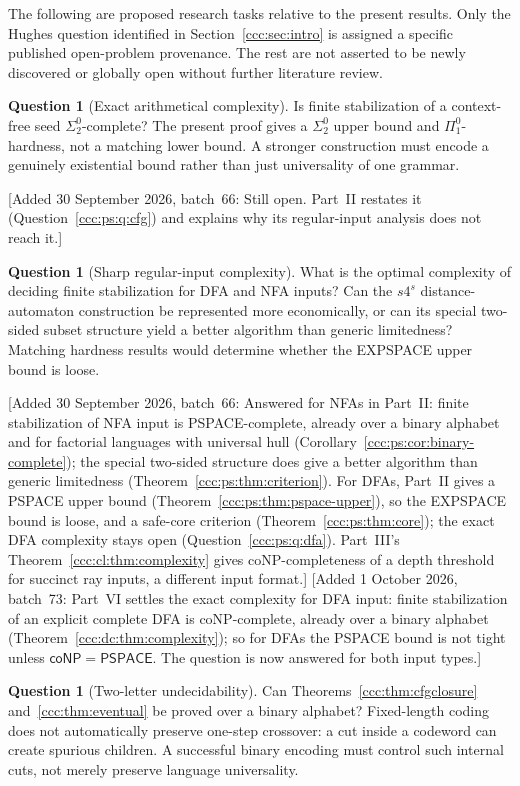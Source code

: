 \documentclass[11pt,letterpaper]{article}
\theoremstyle{definition}
\newtheorem{question}[theorem]{Question}
\theoremstyle{remark}
\newcommand{\wadd}[1]{\textup{[}Added 30 September 2026, batch~66: #1\textup{]}}
\newcommand{\PSPACE}{\mathsf{PSPACE}}
\newcommand{\waddsevthree}[1]{\textup{[}Added 1 October 2026, batch~73: #1\textup{]}}
\newcommand{\coNP}{\mathsf{coNP}}
\begin{document}
The following are proposed research tasks relative to the present results.
Only the Hughes question identified in Section~\ref{ccc:sec:intro} is assigned a
specific published open-problem provenance. The rest are not asserted to be
newly discovered or globally open without further literature review.

\begin{question}[Exact arithmetical complexity]\label{ccc:q:arithmetical}
Is finite stabilization of a context-free seed $\Sigma^0_2$-complete? The
present proof gives a $\Sigma^0_2$ upper bound and $\Pi^0_1$-hardness, not a
matching lower bound. A stronger construction must encode a genuinely
existential bound rather than just universality of one grammar.
\end{question}
\wadd{Still open. Part~II restates it (Question~\ref{ccc:ps:q:cfg}) and
explains why its regular-input analysis does not reach it.}

\begin{question}[Sharp regular-input complexity]\label{ccc:q:regular}
What is the optimal complexity of deciding finite stabilization for DFA and
NFA inputs? Can the $s4^s$ distance-automaton construction be represented more
economically, or can its special two-sided subset structure yield a better
algorithm than generic limitedness? Matching hardness results would determine
whether the EXPSPACE upper bound is loose.
\end{question}
\wadd{Answered for NFAs in Part~II: finite stabilization of NFA input is
PSPACE-complete, already over a binary alphabet and for factorial languages
with universal hull (Corollary~\ref{ccc:ps:cor:binary-complete}); the special
two-sided structure does give a better algorithm than generic limitedness
(Theorem~\ref{ccc:ps:thm:criterion}). For DFAs, Part~II gives a PSPACE upper
bound (Theorem~\ref{ccc:ps:thm:pspace-upper}), so the EXPSPACE bound is loose,
and a safe-core criterion (Theorem~\ref{ccc:ps:thm:core}); the exact DFA
complexity stays open (Question~\ref{ccc:ps:q:dfa}). Part~III's
Theorem~\ref{ccc:cl:thm:complexity} gives coNP-completeness of a depth
threshold for succinct ray inputs, a different input format.}
\waddsevthree{Part~VI settles the exact complexity for DFA input: finite stabilization of an explicit complete DFA is coNP-complete, already over a binary alphabet (Theorem~\ref{ccc:dc:thm:complexity}); so for DFAs the PSPACE bound is not tight
unless $\coNP=\PSPACE$. The question is now answered for both input types.}

\begin{question}[Two-letter undecidability]
Can Theorems~\ref{ccc:thm:cfgclosure} and~\ref{ccc:thm:eventual} be proved over a
binary alphabet? Fixed-length coding does not automatically preserve
one-step crossover: a cut inside a codeword can create spurious children.
A successful binary encoding must control such internal cuts, not merely
preserve language universality.
\end{question}
\end{document}
